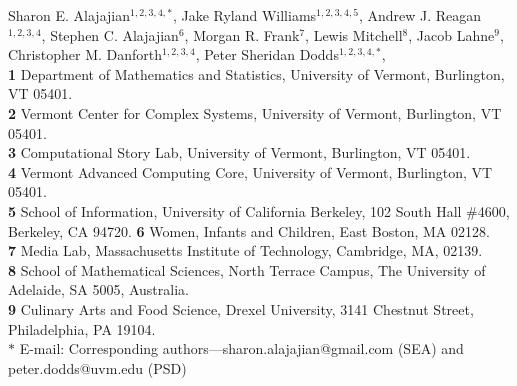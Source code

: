 Sharon E. Alajajian$^{1,2,3,4,\ast}$,
Jake Ryland Williams$^{1,2,3,4,5}$,
Andrew J. Reagan$^{1,2,3,4}$,
Stephen C. Alajajian$^{6}$,
Morgan R. Frank$^{7}$,
Lewis Mitchell$^{8}$,
Jacob Lahne$^{9}$,
Christopher M. Danforth$^{1,2,3,4}$,
Peter Sheridan Dodds$^{1,2,3,4,\ast}$, 
\bigskip\\
\textbf{1} Department of Mathematics and Statistics, University of Vermont, Burlington, VT 05401.
\\
\textbf{2} Vermont Center for Complex Systems, University of Vermont, Burlington, VT 05401.
\\
\textbf{3} Computational Story Lab, University of Vermont, Burlington, VT 05401.
\\
\textbf{4} Vermont Advanced Computing Core, University of Vermont,
Burlington, VT 05401.
\\
\textbf{5} School of Information,
University of California Berkeley,
102 South Hall \#4600, Berkeley, CA 94720.
\textbf{6} Women, Infants and Children, East Boston, MA 02128.
\\
\textbf{7} Media Lab, Massachusetts
Institute of Technology, Cambridge, MA, 02139.
\\
\textbf{8} School of Mathematical Sciences, North Terrace Campus, 
The University of Adelaide, SA 5005, Australia.
\\
\textbf{9} Culinary Arts and Food
Science, Drexel University, 3141 Chestnut Street, Philadelphia, PA
19104.
\\
$\ast$ E-mail: Corresponding authors---sharon.alajajian@gmail.com (SEA) and peter.dodds@uvm.edu (PSD)

